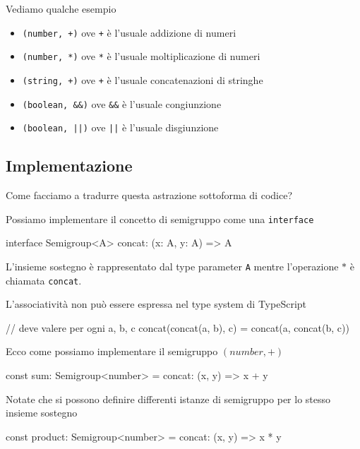 \documentclass[12pt]{article}
\theoremstyle{definition}
\newenvironment{code}
  {\vspace{0.5cm} \VerbatimEnvironment\begin{typescriptcode}}
  {\end{typescriptcode} \vspace{0.2cm}}
\begin{document}
Vediamo qualche esempio

\begin{itemize}
  \item \texttt{(number, +)} ove \texttt{+} è l'usuale addizione di numeri
  \item \texttt{(number, *)} ove \texttt{*} è l'usuale moltiplicazione di numeri
  \item \texttt{(string, +)} ove \texttt{+} è l'usuale concatenazioni di stringhe
  \item \texttt{(boolean, \&\&)} ove \texttt{\&\&} è l'usuale congiunzione
  \item \texttt{(boolean, ||)} ove \texttt{||} è l'usuale disgiunzione
\end{itemize}

\subsection{Implementazione}

Come facciamo a tradurre questa astrazione sottoforma di codice?

Possiamo implementare il concetto di semigruppo come una \texttt{interface}

\begin{code}
interface Semigroup<A> {
  concat: (x: A, y: A) => A
}
\end{code}

L'insieme sostegno è rappresentato dal type parameter \texttt{A} mentre l'operazione $*$ è chiamata \texttt{concat}.

L'associatività non può essere espressa nel type system di TypeScript

\begin{code}
// deve valere per ogni a, b, c
concat(concat(a, b), c) = concat(a, concat(b, c))
\end{code}

Ecco come possiamo implementare il semigruppo $(number, +)$

\begin{code}
const sum: Semigroup<number> = {
  concat: (x, y) => x + y
}
\end{code}

Notate che si possono definire differenti istanze di semigruppo per lo stesso insieme sostegno

\begin{code}
const product: Semigroup<number> = {
  concat: (x, y) => x * y
}
\end{code}
\end{document}
